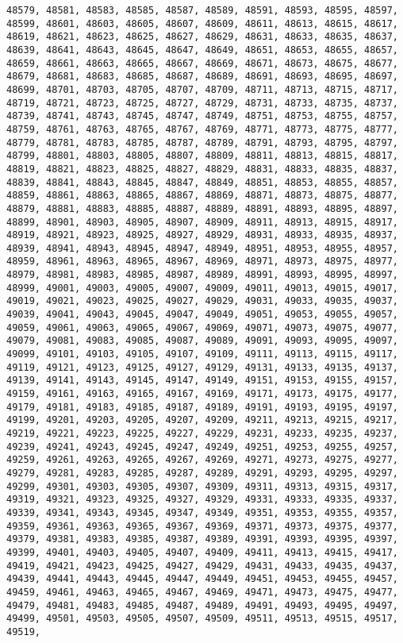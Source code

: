 \documentclass[11pt]{article}
\begin{document}
\begin{Verbatim}[commandchars=\\\{\}]
48579, 48581, 48583, 48585, 48587, 48589, 48591, 48593, 48595, 48597, 48599, 48601, 48603, 48605, 48607, 48609, 48611, 48613, 48615, 48617, 48619, 48621, 48623, 48625, 48627, 48629, 48631, 48633, 48635, 48637, 48639, 48641, 48643, 48645, 48647, 48649, 48651, 48653, 48655, 48657, 48659, 48661, 48663, 48665, 48667, 48669, 48671, 48673, 48675, 48677, 48679, 48681, 48683, 48685, 48687, 48689, 48691, 48693, 48695, 48697, 48699, 48701, 48703, 48705, 48707, 48709, 48711, 48713, 48715, 48717, 48719, 48721, 48723, 48725, 48727, 48729, 48731, 48733, 48735, 48737, 48739, 48741, 48743, 48745, 48747, 48749, 48751, 48753, 48755, 48757, 48759, 48761, 48763, 48765, 48767, 48769, 48771, 48773, 48775, 48777, 48779, 48781, 48783, 48785, 48787, 48789, 48791, 48793, 48795, 48797, 48799, 48801, 48803, 48805, 48807, 48809, 48811, 48813, 48815, 48817, 48819, 48821, 48823, 48825, 48827, 48829, 48831, 48833, 48835, 48837, 48839, 48841, 48843, 48845, 48847, 48849, 48851, 48853, 48855, 48857, 48859, 48861, 48863, 48865, 48867, 48869, 48871, 48873, 48875, 48877, 48879, 48881, 48883, 48885, 48887, 48889, 48891, 48893, 48895, 48897, 48899, 48901, 48903, 48905, 48907, 48909, 48911, 48913, 48915, 48917, 48919, 48921, 48923, 48925, 48927, 48929, 48931, 48933, 48935, 48937, 48939, 48941, 48943, 48945, 48947, 48949, 48951, 48953, 48955, 48957, 48959, 48961, 48963, 48965, 48967, 48969, 48971, 48973, 48975, 48977, 48979, 48981, 48983, 48985, 48987, 48989, 48991, 48993, 48995, 48997, 48999, 49001, 49003, 49005, 49007, 49009, 49011, 49013, 49015, 49017, 49019, 49021, 49023, 49025, 49027, 49029, 49031, 49033, 49035, 49037, 49039, 49041, 49043, 49045, 49047, 49049, 49051, 49053, 49055, 49057, 49059, 49061, 49063, 49065, 49067, 49069, 49071, 49073, 49075, 49077, 49079, 49081, 49083, 49085, 49087, 49089, 49091, 49093, 49095, 49097, 49099, 49101, 49103, 49105, 49107, 49109, 49111, 49113, 49115, 49117, 49119, 49121, 49123, 49125, 49127, 49129, 49131, 49133, 49135, 49137, 49139, 49141, 49143, 49145, 49147, 49149, 49151, 49153, 49155, 49157, 49159, 49161, 49163, 49165, 49167, 49169, 49171, 49173, 49175, 49177, 49179, 49181, 49183, 49185, 49187, 49189, 49191, 49193, 49195, 49197, 49199, 49201, 49203, 49205, 49207, 49209, 49211, 49213, 49215, 49217, 49219, 49221, 49223, 49225, 49227, 49229, 49231, 49233, 49235, 49237, 49239, 49241, 49243, 49245, 49247, 49249, 49251, 49253, 49255, 49257, 49259, 49261, 49263, 49265, 49267, 49269, 49271, 49273, 49275, 49277, 49279, 49281, 49283, 49285, 49287, 49289, 49291, 49293, 49295, 49297, 49299, 49301, 49303, 49305, 49307, 49309, 49311, 49313, 49315, 49317, 49319, 49321, 49323, 49325, 49327, 49329, 49331, 49333, 49335, 49337, 49339, 49341, 49343, 49345, 49347, 49349, 49351, 49353, 49355, 49357, 49359, 49361, 49363, 49365, 49367, 49369, 49371, 49373, 49375, 49377, 49379, 49381, 49383, 49385, 49387, 49389, 49391, 49393, 49395, 49397, 49399, 49401, 49403, 49405, 49407, 49409, 49411, 49413, 49415, 49417, 49419, 49421, 49423, 49425, 49427, 49429, 49431, 49433, 49435, 49437, 49439, 49441, 49443, 49445, 49447, 49449, 49451, 49453, 49455, 49457, 49459, 49461, 49463, 49465, 49467, 49469, 49471, 49473, 49475, 49477, 49479, 49481, 49483, 49485, 49487, 49489, 49491, 49493, 49495, 49497, 49499, 49501, 49503, 49505, 49507, 49509, 49511, 49513, 49515, 49517, 49519, 
\end{Verbatim}
\end{document}
